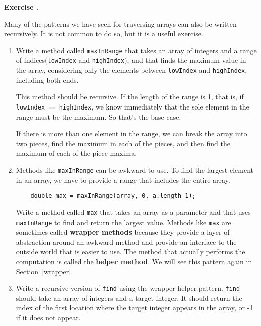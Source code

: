 \documentclass{book}
\newcounter{exercisenum}
\renewcommand{\theexercisenum}{{\thechapter}.\arabic{exercisenum}}
\newenvironment{exercisesize}{\begin{small}}{\end{small}}
\newcommand{\exerciseheader}[2]{                                          
     
  \begin{exercisesize}                                                    
     
     
  \def\theenumi{\alph{enumi}}                                             
  \def\labelenumi{\theenumi.}                                             
  \def\theenumii{\roman{enumii}}                                          
  \def\labelenumii{\theenumii.}                                           
  {\bf Exercise {#1}{#2}}\hspace{0.1in}                 
}
\newcommand{\startexercise}[1]{%
  \refstepcounter{exercisenum}                                            
  \exerciseheader{\theexercisenum}{#1}                                    
}
\newcommand{\stopexercise}{%
  {\hfill}                                                               
  \end{exercisesize}      
}
\newcommand{\normaldif}{}
\newenvironment{exercise}{\startexercise{\normaldif{}}}{\stopexercise}
\begin{document}
\begin{exercise}
Many of the patterns we have seen for traversing arrays can
also be written recursively.  It is not common to do so, but
it is a useful exercise.

\begin{enumerate}

\item Write a method called {\tt maxInRange} that takes an array of
integers and a range of indices({\tt lowIndex} and {\tt highIndex}),
and that finds the maximum value in the array, considering only the
elements between {\tt lowIndex} and {\tt highIndex}, including both
ends.

This method should be recursive.  If the length of the range is 1,
that is, if {\tt lowIndex == highIndex}, we know immediately that the
sole element in the range must be the maximum.  So that's the base
case.

If there is more than one element in the range, we can break the array
into two pieces, find the maximum in each of the pieces, and then find
the maximum of each of the piece-maxima.

\item Methods like {\tt maxInRange} can be awkward to use.  To
find the largest element in an array, we have to provide a range
that includes the entire array.

\begin{verbatim}
    double max = maxInRange(array, 0, a.length-1);
\end{verbatim}

Write a method called {\tt max} that takes an array as a parameter
and that uses {\tt maxInRange} to find and return the largest value.
Methods like {\tt max} are sometimes called {\bf wrapper methods}
because they provide a layer of abstraction around an awkward method
and provide an interface to
the outside world that is easier to use.  The method that actually
performs the computation is called the {\bf helper method}.  We will
see this pattern again in Section~\ref{wrapper}.

\item Write a recursive version of {\tt find} using the
wrapper-helper pattern.  {\tt find} should take an array of
integers and a target integer.  It should return the index
of the first location where the target integer appears in the
array, or -1 if it does not appear.

\end{enumerate}
\end{exercise}
\end{document}
